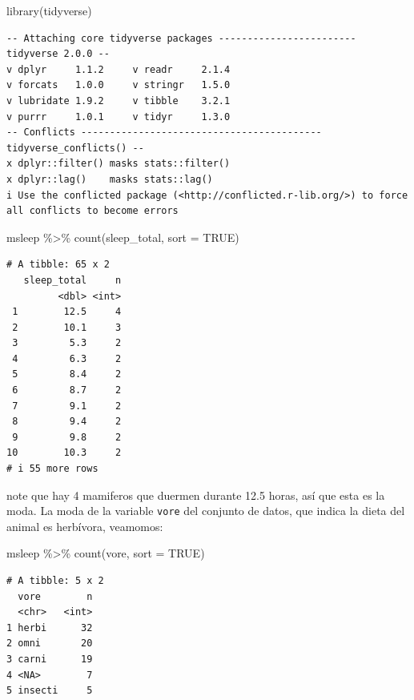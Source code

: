 \documentclass[
  letterpaper,
  DIV=11,
  numbers=noendperiod]{scrreprt}
\newenvironment{Shaded}{\begin{snugshade}}{\end{snugshade}}
\newcommand{\AttributeTok}[1]{\textcolor[rgb]{0.40,0.45,0.13}{#1}}
\newcommand{\ConstantTok}[1]{\textcolor[rgb]{0.56,0.35,0.01}{#1}}
\newcommand{\FunctionTok}[1]{\textcolor[rgb]{0.28,0.35,0.67}{#1}}
\newcommand{\NormalTok}[1]{\textcolor[rgb]{0.00,0.23,0.31}{#1}}
\newcommand{\SpecialCharTok}[1]{\textcolor[rgb]{0.37,0.37,0.37}{#1}}
\begin{document}
\begin{Shaded}
\begin{Highlighting}[]
\FunctionTok{library}\NormalTok{(tidyverse)}
\end{Highlighting}
\end{Shaded}

\begin{verbatim}
-- Attaching core tidyverse packages ------------------------ tidyverse 2.0.0 --
v dplyr     1.1.2     v readr     2.1.4
v forcats   1.0.0     v stringr   1.5.0
v lubridate 1.9.2     v tibble    3.2.1
v purrr     1.0.1     v tidyr     1.3.0
-- Conflicts ------------------------------------------ tidyverse_conflicts() --
x dplyr::filter() masks stats::filter()
x dplyr::lag()    masks stats::lag()
i Use the conflicted package (<http://conflicted.r-lib.org/>) to force all conflicts to become errors
\end{verbatim}

\begin{Shaded}
\begin{Highlighting}[]
\NormalTok{msleep }\SpecialCharTok{\%\textgreater{}\%} \FunctionTok{count}\NormalTok{(sleep\_total, }\AttributeTok{sort =} \ConstantTok{TRUE}\NormalTok{)}
\end{Highlighting}
\end{Shaded}

\begin{verbatim}
# A tibble: 65 x 2
   sleep_total     n
         <dbl> <int>
 1        12.5     4
 2        10.1     3
 3         5.3     2
 4         6.3     2
 5         8.4     2
 6         8.7     2
 7         9.1     2
 8         9.4     2
 9         9.8     2
10        10.3     2
# i 55 more rows
\end{verbatim}

note que hay 4 mamiferos que duermen durante 12.5 horas, así que esta es
la moda. La moda de la variable \texttt{vore} del conjunto de datos, que
indica la dieta del animal es herbívora, veamomos:

\begin{Shaded}
\begin{Highlighting}[]
\NormalTok{msleep }\SpecialCharTok{\%\textgreater{}\%} \FunctionTok{count}\NormalTok{(vore, }\AttributeTok{sort =} \ConstantTok{TRUE}\NormalTok{)}
\end{Highlighting}
\end{Shaded}

\begin{verbatim}
# A tibble: 5 x 2
  vore        n
  <chr>   <int>
1 herbi      32
2 omni       20
3 carni      19
4 <NA>        7
5 insecti     5
\end{verbatim}
\end{document}
